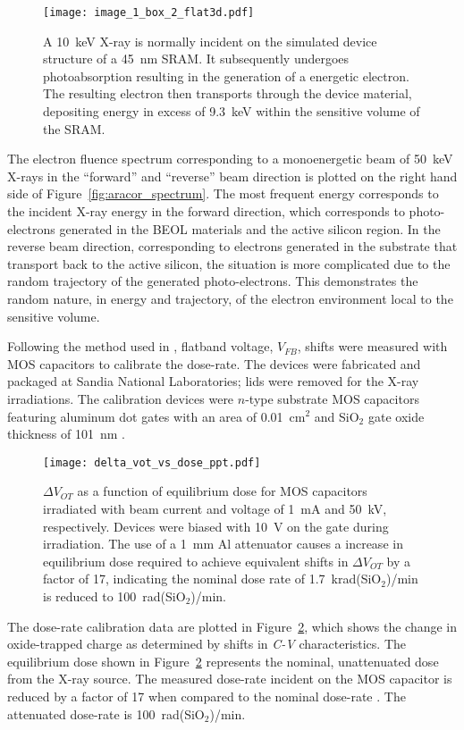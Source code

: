 \begin{figure}[htbp]
    \centering
        \texttt{[image: image\_1\_box\_2\_flat3d.pdf]}
        \caption{A 10~keV X-ray is normally incident on the simulated device structure of a 45~nm SRAM. It subsequently undergoes photoabsorption resulting in the generation of a energetic electron. The resulting electron then transports through the device material, depositing energy in excess of 9.3~keV within the sensitive volume of the SRAM.}
        \label{fig:photoabsorption_opendx}
\end{figure}

The electron fluence spectrum corresponding to a monoenergetic beam of 50~keV X-rays in the ``forward'' and ``reverse'' beam direction is plotted on the right hand side of Figure~\ref{fig:aracor_spectrum}.
The most frequent energy corresponds to the incident X-ray energy in the forward direction, which corresponds to photo-electrons generated in the BEOL materials and the active silicon region.
In the reverse beam direction, corresponding to electrons generated in the substrate that transport back to the active silicon, the situation is more complicated due to the random trajectory of the generated photo-electrons. 
This demonstrates the random nature, in energy and trajectory, of the electron environment local to the sensitive volume.

Following the method used in \cite{Fleetwood:1986ug}, flatband voltage, $V_{FB}$, shifts were measured with MOS capacitors to calibrate the dose-rate. 
The devices were fabricated and packaged at Sandia National Laboratories; lids were removed for the X-ray irradiations. 
The calibration devices were $n$-type substrate MOS capacitors featuring aluminum dot gates with an area of 0.01~cm$^2$ and SiO$_2$ gate oxide thickness of 101~nm \cite{Schwank:1987fq}. 
\begin{figure}[tb]
    \centering
        \texttt{[image: delta\_vot\_vs\_dose\_ppt.pdf]}
    \caption{$\Delta V_{OT}$ as a function of equilibrium dose for MOS capacitors irradiated with beam current and voltage of 1~mA and 50~kV, respectively. Devices were biased with 10~V on the gate during irradiation. The use of a 1~mm Al attenuator causes a increase in equilibrium dose required to achieve equivalent shifts in $\Delta V_{OT}$ by a factor of 17, indicating the nominal dose rate of 1.7~krad(SiO$_2$)/min is reduced to 100~rad(SiO$_2$)/min.}
    \label{fig:delta_vot_vs_dose}
\end{figure}
The dose-rate calibration data are plotted in Figure~\ref{fig:delta_vot_vs_dose}, which shows the change in oxide-trapped charge as determined by shifts in \emph{C-V} characteristics.
The equilibrium dose shown in Figure~\ref{fig:delta_vot_vs_dose} represents the nominal, unattenuated dose from the X-ray source. 
The measured dose-rate incident on the MOS capacitor is reduced by a factor of 17 when compared to the nominal dose-rate \cite{Fleetwood:1986ug}. 
The attenuated dose-rate is 100~rad(SiO$_2$)/min. 

